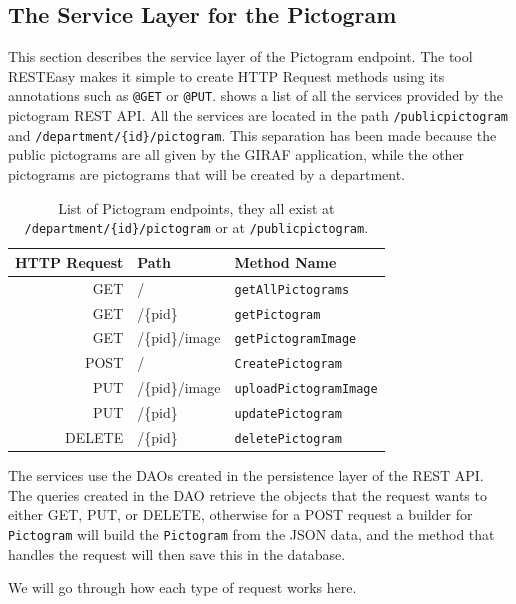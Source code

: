 \subsection{The Service Layer for the Pictogram}
This section describes the service layer of the Pictogram endpoint.
The tool RESTEasy makes it simple to create HTTP Request methods using its annotations such as \texttt{@GET} or \texttt{@PUT}.
 shows a list of all the services provided by the pictogram REST API.
All the services are located in the path \texttt{/publicpictogram} and \texttt{/department/\{id\}/pictogram}.
This separation has been made because the public pictograms are all given by the GIRAF application, while the other pictograms are pictograms that will be created by a department.

\begin{table}[]
\footnotesize
\centering
\begin{tabular}{rll}
HTTP Request    & Path          & Method Name                   \\
\midrule
GET             &/              & \texttt{getAllPictograms}     \\
GET             &/\{pid\}       & \texttt{getPictogram}         \\
GET             &/\{pid\}/image & \texttt{getPictogramImage}    \\
\tblgrpsep
POST            &/              & \texttt{CreatePictogram}      \\
\tblgrpsep
PUT             &/\{pid\}/image & \texttt{uploadPictogramImage} \\
PUT             &/\{pid\}       & \texttt{updatePictogram}      \\
\tblgrpsep
DELETE          &/\{pid\}	    & \texttt{deletePictogram}	    \\
\end{tabular}
\caption{List of Pictogram endpoints, they all exist at \texttt{/department/\{id\}/pictogram} or at \texttt{/publicpictogram}.}\label{tbl:pictogramservice}
\end{table}

The services use the DAOs created in the persistence layer of the REST API.
The queries created in the DAO retrieve the objects that the request wants to either GET, PUT, or DELETE, otherwise for a POST request a builder for \texttt{Pictogram} will build the \texttt{Pictogram} from the JSON data, and the method that handles the request will then save this in the database.

We will go through how each type of request works here.

